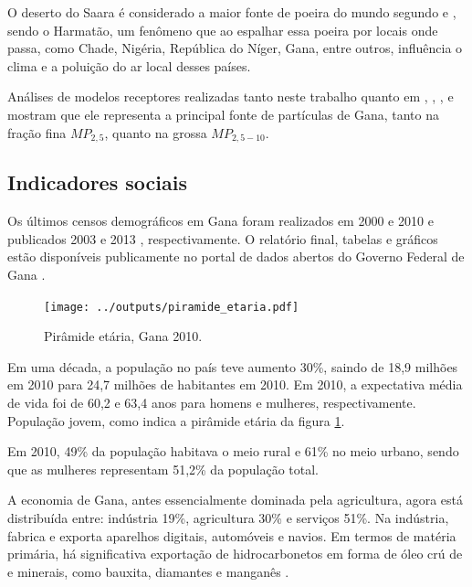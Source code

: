 O deserto do Saara é considerado a maior fonte de poeira do mundo segundo 
\citet{breuning2005} e \citet{prospero2002}, sendo o Harmatão, um fenômeno que 
ao espalhar essa poeira por locais onde passa, como Chade, Nigéria, 
República do Níger, Gana, entre outros, influência o clima e a poluição do ar 
local desses países.

Análises de modelos receptores 
realizadas tanto neste trabalho quanto em \citet{aboh2009}, \citet{dionisio2010b}, 
\citet{zhou2011}, \citet{ofosu2012} e \citet{rooney2012} mostram que ele 
representa a principal 
fonte de partículas de Gana, tanto na fração fina $MP_{2,5}$, quanto na grossa 
$MP_{2,5-10}$.

\subsection{Indicadores sociais}

Os últimos censos demográficos em Gana foram realizados em 2000 e 2010 
e publicados 2003 \citep{ghanacensus2003} e 2013 \citep{ghanacensus2013}, 
respectivamente. O relatório final, tabelas e gráficos estão disponíveis
publicamente no portal de dados abertos do Governo Federal de Gana 
\citep{opendataghana}.

\begin{figure}
  \centering
  \texttt{[image: ../outputs/piramide\_etaria.pdf]}
  \caption{Pirâmide etária, Gana 2010. \citep{ghanacensus2013} 
           \label{fig:piramedegana}}
\end{figure}

Em uma década, a população no país teve aumento 30\%, saindo de 18,9 milhões em 
2010 para 24,7 milhões de habitantes em 2010. Em 2010, a expectativa média de 
vida foi de 60,2 e 63,4 anos para homens e mulheres, respectivamente.
População jovem, como indica a pirâmide etária da figura \ref{fig:piramedegana}.

Em 2010, 49\% da população habitava o meio rural e 61\% no meio urbano, 
sendo que as mulheres representam 51,2\% da população total.

A economia de Gana, antes essencialmente dominada pela agricultura, 
agora está distribuída entre: indústria 19\%, agricultura 30\% 
e serviços 51\%. Na indústria, fabrica e exporta aparelhos digitais, 
automóveis e navios. Em termos de matéria primária, há significativa 
exportação de hidrocarbonetos em forma de óleo crú de e minerais,
como bauxita, diamantes e manganês \citep{ghanacensus2013}.
  
